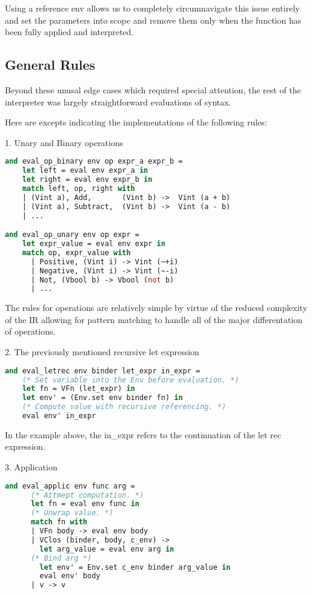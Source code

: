 \documentclass{l4proj}
\begin{document}
Using a reference env allows us to completely circumnavigate this issue entirely and set the parameters into scope and remove them only when the function has been fully applied and interpreted.

\subsection{General Rules}
Beyond these unusal edge cases which required special attention, the rest of the interpreter was largely straightforward evaluations of syntax.

Here are excepts indicating the implementations of the following rules:

1. Unary and Binary operations

\begin{lstlisting}[language=Caml, caption=Excerpt of the PyFunc Interpreter rules for binary and unary operations.]
and eval_op_binary env op expr_a expr_b =
    let left = eval env expr_a in
    let right = eval env expr_b in
    match left, op, right with
    | (Vint a), Add,       (Vint b) ->  Vint (a + b)
    | (Vint a), Subtract,  (Vint b) ->  Vint (a - b)
    | ...

and eval_op_unary env op expr = 
    let expr_value = eval env expr in
    match op, expr_value with
      | Positive, (Vint i) -> Vint (~+i)
      | Negative, (Vint i) -> Vint (~-i)
      | Not, (Vbool b) -> Vbool (not b)
      | ...
\end{lstlisting}
The rules for operations are relatively simple by virtue of the reduced complexity of the IR allowing for pattern matching to handle all of the major differentation of operations.

2. The previously mentioned recursive let expression

\begin{lstlisting}[language=Caml, caption=The Pyfunc Interpreter let rec rule.]
and eval_letrec env binder let_expr in_expr =
    (* Set variable into the Env before evaluation. *)
    let fn = VFn (let_expr) in
    let env' = (Env.set env binder fn) in
    (* Compute value with recursive referencing. *)
    eval env' in_expr
\end{lstlisting}

In the example above, the in\_expr refers to the continuation of the let rec expression.

3. Application

\begin{lstlisting}[language=Caml, caption=The PyFunc interpreter's application rule.]
    and eval_applic env func arg =
      (* Attmept computation. *)
      let fn = eval env func in
      (* Unwrap value. *)
      match fn with 
      | VFn body -> eval env body
      | VClos (binder, body, c_env) -> 
        let arg_value = eval env arg in
      (* Bind arg *)
        let env' = Env.set c_env binder arg_value in
        eval env' body 
      | v -> v
\end{lstlisting}
\end{document}
